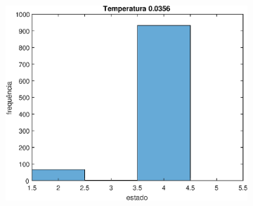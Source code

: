 \documentclass[12pt]{article}
\newenvironment{exercise}[2][Exercício]{\begin{trivlist}
\item[\hskip \labelsep {\bfseries #1}\hskip \labelsep {\bfseries #2.}]}{\end{trivlist}}
\begin{document}
\begin{exercise}{2.e}
\begin{figure}[H]
\begin{subfigure}[b]{0.3\textwidth}
        \includegraphics[width=\textwidth]{figs/ex2e_h6.eps}
    \end{subfigure}
\end{figure}


\end{exercise}
\end{document}
